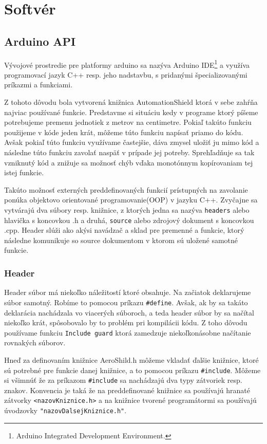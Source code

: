 \section{Softvér}
\subsection{Arduino API}

Vývojové prostredie pre platformy arduino sa nazýva Arduino IDE\footnote[5]{Arduino Integrated Development Environment.} a využíva programovací jazyk C++ resp. jeho nadstavbu, s pridanými špecializovanými príkazmi a funkciami. 

Z tohoto dôvodu bola vytvorená knižnica AutomationShield ktorá v sebe zahŕňa najviac používané funkcie. Predstavme si situáciu kedy v programe ktorý píšeme potrebujeme premenu jednotiek z metrov na centimetre. Pokiaľ takúto funkciu použijeme v kóde jeden krát, môžeme túto funkciu napísať priamo do kódu. Avšak pokiaľ túto funkciu využívame častejšie, dáva zmysel uložiť ju mimo kód a následne túto funkciu zavolať naspäť v prípade jej potreby. Sprehľadňuje sa tak vzniknutý kód a znižuje sa možnosť chýb vďaka monotónnym kopírovaniam tej istej funkcie. 

Takúto možnosť externých preddefinovaných funkcií prístupných na zavolanie ponúka objektovo orientované programovanie(OOP) v jazyku C++\cite{oop}. Zvyčajne sa vytvárajú dva súbory resp. knižnice, z ktorých jedna sa nazýva \verb|headers| alebo hlavička s koncovkou .h a druhá, \verb|source| alebo zdrojový dokument s koncovkou .cpp. Header slúži ako akýsi navádzač a sklad pre premenné a funkcie, ktorý následne komunikuje so source dokumentom v ktorom sú uložené samotné funkcie. 

\subsubsection{Header}

Header súbor má niekoľko náležitostí ktoré obsahuje. Na začiatok deklarujeme súbor samotný. Robíme to pomocou príkazu \verb|#define|. Avšak, ak by sa takáto deklarácia nachádzala vo viacerých súboroch, a teda header súbor by sa načítal niekoľko krát, spôsobovalo by to problém pri kompilácii kódu. Z toho dôvodu používame funkciu \verb|Include guard| ktorá zamedzuje niekoľkonásobne načítanie rovnakých súborov. 

Hneď za definovaním knižnice AeroShild.h môžeme vkladať ďalšie knižnice, ktoré sú potrebné pre funkcie danej knižnice, a to pomocou príkazu \verb|#include|. Môžeme si všimnúť že za príkazom \verb|#include| sa nachádzajú dva typy zátvoriek resp. znakov. Konvencia je taká že na preddefinované knižnice sa používajú hranaté zátvorky \verb|<nazovKniznice.h>| a na knižnice tvorené programátormi sa používajú úvodzovky \verb|"nazovDalsejKniznice.h"|.

